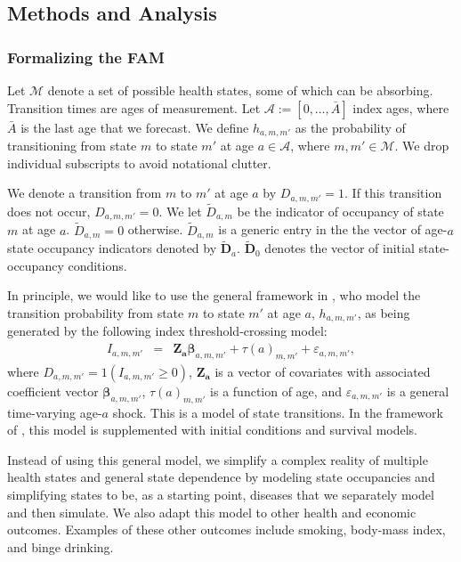 \subsection{Methods and Analysis}

\subsubsection{Formalizing the FAM}
\label{section:transition_models}

Let $\mathcal{M}$ denote a set of possible health states, some of which can be absorbing. Transition times are ages of measurement. Let $\mathcal{A}:= [ 0, \ldots, \bar{A}]$ index ages, where $\bar{A}$ is the last age that we forecast. We define $h_{a,m,m'}$ as the probability of transitioning from state $m$ to state $m'$ at age $a \in \mathcal{A}$, where $m, m' \in \mathcal{M}$. We drop individual subscripts to avoid notational clutter.

We denote a transition from $m$ to $m'$ at age $a$ by $D_{a,m,m'} = 1$. If this transition does not occur,  $D_{a,m,m'} = 0$. We let $\tilde{D}_{a,m}$ be the indicator of occupancy of state $m$ at age $a$. $\tilde{D}_{a,m} = 0$ otherwise. $\tilde{D}_{a,m}$ is a generic entry in the the vector of age-$a$ state occupancy indicators denoted by $\tilde{\bm{D}}_a$. $\tilde{\bm{D}}_0$ denotes the vector of initial state-occupancy conditions.

In principle, we would like to use the general framework in \citet{Heckman_1981_heterogeneity,Heckman_1981_IncidentalParametersProblem}, who model the transition probability from state $m$ to state $m'$ at age $a$, $h_{a,m,m'}$, as being generated by the following index threshold-crossing model:
\begin{eqnarray}
I_{a,m,m'} &=& \bm{Z_a} \bm{\beta}_{a,m,m'} + \tau \left( a \right)_{m,m'} + \varepsilon_{a,m,m'}, \label{eq:trans0}
\end{eqnarray}
where $D_{a,m,m'} = \bm{\mathit{1}}  \left( I_{a,m,m'} \geq 0 \right)$, $\bm{Z_a}$ is a vector of covariates with associated coefficient vector $ \bm{\beta}_{a,m,m'}$, $\tau \left( a \right)_{m,m'}$ is a function of age, and $\varepsilon_{a,m,m'}$ is a general time-varying age-$a$ shock. This is a model of state transitions. In the framework of  \citet{Heckman_1981_heterogeneity,Heckman_1981_IncidentalParametersProblem}, this model is supplemented with initial conditions and survival models.

Instead of using this general model, we simplify a complex reality of multiple health states and general state dependence by modeling state occupancies and simplifying states to be, as a starting point, diseases that we separately model and then simulate. We also adapt this model to other health and economic outcomes. Examples of these other outcomes include smoking, body-mass index, and binge drinking.

